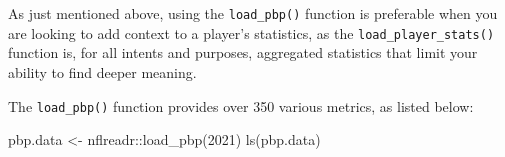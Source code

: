 \documentclass[
  letterpaper,
]{krantz}
\newenvironment{Shaded}{\begin{snugshade}}{\end{snugshade}}
\newcommand{\DecValTok}[1]{\textcolor[rgb]{0.68,0.00,0.00}{#1}}
\newcommand{\FunctionTok}[1]{\textcolor[rgb]{0.28,0.35,0.67}{#1}}
\newcommand{\NormalTok}[1]{\textcolor[rgb]{0.00,0.23,0.31}{#1}}
\newcommand{\OtherTok}[1]{\textcolor[rgb]{0.00,0.23,0.31}{#1}}
\newcommand{\SpecialCharTok}[1]{\textcolor[rgb]{0.37,0.37,0.37}{#1}}
\begin{document}
As just mentioned above, using the \texttt{load\_pbp()} function is
preferable when you are looking to add context to a player's statistics,
as the \texttt{load\_player\_stats()} function is, for all intents and
purposes, aggregated statistics that limit your ability to find deeper
meaning.

The \texttt{load\_pbp()} function provides over 350 various metrics, as
listed below:

\begin{Shaded}
\begin{Highlighting}[]
\NormalTok{pbp.data }\OtherTok{\textless{}{-}}\NormalTok{ nflreadr}\SpecialCharTok{::}\FunctionTok{load\_pbp}\NormalTok{(}\DecValTok{2021}\NormalTok{)}
\FunctionTok{ls}\NormalTok{(pbp.data)}
\end{Highlighting}
\end{Shaded}
\end{document}
